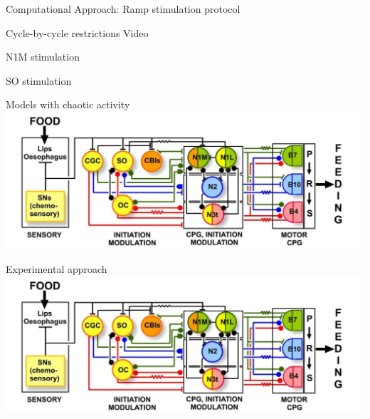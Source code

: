 \documentclass[aspectratio=43]{beamer}
\begin{document}
\begin{frame}{Computational Approach: Ramp stimulation protocol}
\end{frame}

\begin{frame}{Cycle-by-cycle restrictions}
	Video
\end{frame}

\begin{frame}{N1M stimulation}
\end{frame}


\begin{frame}{SO stimulation}
\end{frame}


\begin{frame}{Models with chaotic activity}
	\includegraphics[width=\textwidth]{invariants/distributed_benjamin_2012.png}
\end{frame}



\begin{frame}{Experimental approach}
	\includegraphics[width=\textwidth]{invariants/distributed_benjamin_2012.png}
\end{frame}
\end{document}
